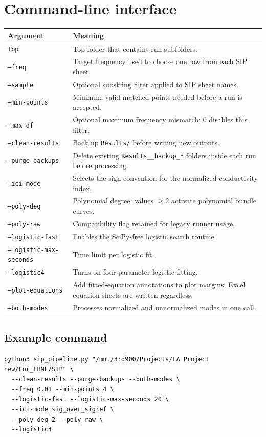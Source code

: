 \documentclass[11pt]{article}
\begin{document}
\section{Command-line interface}
\begin{longtable}{p{} p{}}
\toprule
\textbf{Argument} & \textbf{Meaning}\\
\midrule
\endhead
\texttt{top} & Top folder that contains run subfolders.\\
\texttt{--freq} & Target frequency used to choose one row from each SIP sheet.\\
\texttt{--sample} & Optional substring filter applied to SIP sheet names.\\
\texttt{--min-points} & Minimum valid matched points needed before a run is accepted.\\
\texttt{--max-df} & Optional maximum frequency mismatch; 0 disables this filter.\\
\texttt{--clean-results} & Back up \texttt{Results/} before writing new outputs.\\
\texttt{--purge-backups} & Delete existing \texttt{Results\_\_backup\_*} folders inside each run before processing.\\
\texttt{--ici-mode} & Selects the sign convention for the normalized conductivity index.\\
\texttt{--poly-deg} & Polynomial degree; values $\ge 2$ activate polynomial bundle curves.\\
\texttt{--poly-raw} & Compatibility flag retained for legacy runner usage.\\
\texttt{--logistic-fast} & Enables the SciPy-free logistic search routine.\\
\texttt{--logistic-max-seconds} & Time limit per logistic fit.\\
\texttt{--logistic4} & Turns on four-parameter logistic fitting.\\
\texttt{--plot-equations} & Add fitted-equation annotations to plot margins; Excel equation sheets are written regardless.\\
\texttt{--both-modes} & Processes normalized and unnormalized modes in one call.\\
\bottomrule
\end{longtable}

\subsection{Example command}
\begin{verbatim}
python3 sip_pipeline.py "/mnt/3rd900/Projects/LA Project new/For_LBNL/SIP" \
  --clean-results --purge-backups --both-modes \
  --freq 0.01 --min-points 4 \
  --logistic-fast --logistic-max-seconds 20 \
  --ici-mode sig_over_sigref \
  --poly-deg 2 --poly-raw \
  --logistic4
\end{verbatim}
\end{document}
